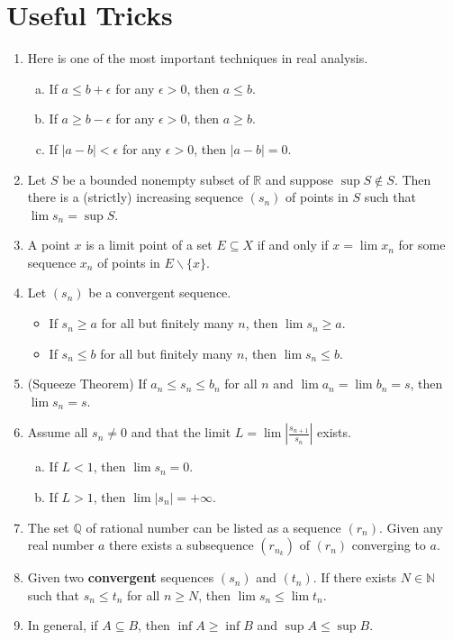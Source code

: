 \documentclass[12pt, lettersize]{book}
\theoremstyle{plain}
\theoremstyle{definition}
\theoremstyle{remark}
\newcommand{\R}{\mathbb{R}}
\newcommand{\N}{\mathbb{N}}
\begin{document}
	\chapter{Useful Tricks}
	\begin{enumerate}
		\item Here is one of the most important techniques in real analysis.
		\begin{enumerate}[(a)]
			\item If $a\leq b+\epsilon$ for any $\epsilon>0$, then $a\leq b$.
			\item If $a\geq b-\epsilon$ for any $\epsilon>0$, then $a\geq b$.
			\item If $|a-b|<\epsilon$ for any $\epsilon>0$, then $|a-b|=0$.
		\end{enumerate}
		\item Let $S$ be a bounded nonempty subset of $\R$ and suppose $\sup S\notin S$. Then there is a (strictly) increasing sequence $(s_n)$ of points in $S$ such that $\lim s_n=\sup S$.
		\item A point $x$ is a limit point of a set $E\subseteq X$ if and only if $x=\lim x_n$ for some sequence $x_n$ of points in $E\backslash\{x\}$. 
		\item Let $(s_n)$ be a convergent sequence.
		\begin{itemize}
			\item If $s_n\geq a$ for all but finitely many $n$, then $\lim s_n\geq a$.
			\item If $s_n\leq b$ for all but finitely many $n$, then $\lim s_n\leq b$.
		\end{itemize}
		\item (Squeeze Theorem) If $a_n\leq s_n\leq b_n$ for all $n$ and $\lim a_n=\lim b_n=s$, then $\lim s_n=s$.
		\item Assume all $s_n\neq0$ and that the limit $L=\lim\left|\frac{s_{n+1}}{s_n}\right|$ exists.
		\begin{enumerate}[(a)]
			\item If $L<1$, then $\lim s_n=0$.
			\item If $L>1$, then $\lim |s_n|=+\infty$.
		\end{enumerate} 
		\item The set $\mathbb{Q}$ of rational number can be listed as a sequence $(r_n)$. Given any real number $a$ there exists a subsequence $(r_{n_k})$ of $(r_n)$ converging to $a$.
		\item Given two \textbf{convergent} sequences $(s_n)$ and $(t_n)$. If there exists $N\in\N$ such that $s_n\leq t_n$ for all $n\geq N$, then $\lim s_n\leq\lim t_n$.
		\item In general, if $A\subseteq B$, then $\inf A\geq \inf B$ and $\sup A\leq \sup B$.
	\end{enumerate}
	
\end{document}
